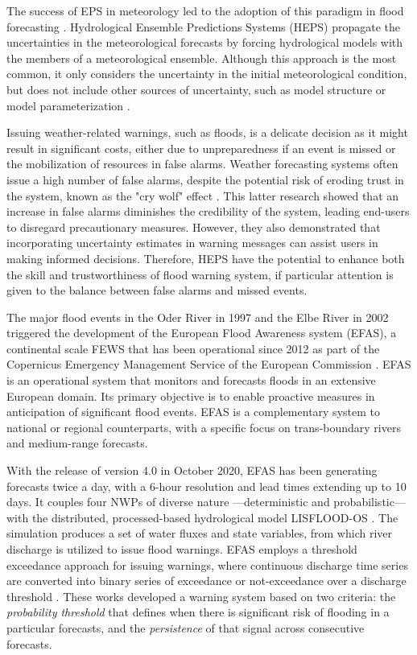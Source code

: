 \documentclass{ametsocV6.1}
\begin{document}
The success of EPS in meteorology led to the adoption of this paradigm in flood forecasting \citep{DeRoo2003, Bartholmes2005, Pappenberger2005, Roulin2005, Diomede2008, Yang2020}. Hydrological Ensemble Predictions Systems (HEPS) propagate the uncertainties in the meteorological forecasts by forcing hydrological models with the members of a meteorological ensemble. Although this approach is the most common, it only considers the uncertainty in the initial meteorological condition, but does not include other sources of uncertainty, such as model structure or model parameterization \citep{Cloke2009}. 

Issuing weather-related warnings, such as floods, is a delicate decision as it might result in significant costs, either due to unpreparedness if an event is missed or the mobilization of resources in false alarms. Weather forecasting systems often issue a high number of false alarms, despite the potential risk of eroding trust in the system, known as the "cry wolf" effect \citep{Bouttier2024, LeClerc2015}. This latter research showed that an increase in false alarms diminishes the credibility of the system, leading end-users to disregard precautionary measures. However, they also demonstrated that incorporating uncertainty estimates in warning messages can assist users in making informed decisions. Therefore, HEPS have the potential to enhance both the skill and trustworthiness of flood warning system, if particular attention is given to the balance between false alarms and missed events.

The major flood events in the Oder River in 1997 and the Elbe River in 2002 triggered the development of the European Flood Awareness system (EFAS), a continental scale FEWS that has been operational  since 2012 as part of the Copernicus Emergency Management Service of the European Commission \citep{Bartholmes2009, Thielen2009a}. EFAS is an operational system that monitors and forecasts floods in an extensive European domain. Its primary objective is to enable proactive measures in anticipation of significant flood events. EFAS is a complementary system to national or regional counterparts, with a specific focus on trans-boundary rivers and medium-range forecasts.

With the release of version 4.0 in October 2020, EFAS has been generating forecasts twice a day, with a 6-hour resolution and lead times extending up to 10 days. It couples four NWPs of diverse nature —deterministic and probabilistic— with the distributed, processed-based hydrological model LISFLOOD-OS \citep{DeRoo2000, Burek2013a}. The simulation produces a set of water fluxes and state variables, from which river discharge is utilized to issue flood warnings. EFAS employs a threshold exceedance approach for issuing warnings, where continuous discharge time series are converted into binary series of exceedance or not-exceedance over a discharge threshold \citep{Ramos2007, Thielen2009a, Bartholmes2009}. These works developed a warning system based on two criteria: the \textit{probability threshold} that defines when there is significant risk of flooding in a particular forecasts, and the \textit{persistence} of that signal across consecutive forecasts.
\end{document}

